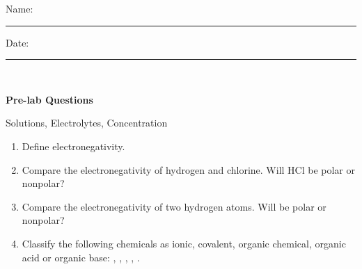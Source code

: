 \documentclass[main.tex]{subfiles}
\begin{document}
\newpage
\setdoublesep{0.35700 em}  %
\setatomsep{1.78500 em}    %
\setbondoffset{0.18265 em} %
\newcommand{\bondwidth}{0.06642 em} %
\setbondstyle{line width = \bondwidth}

 




\begin{multicols}{2}
\begin{tcolorbox}[enhanced jigsaw,breakable,size=title,
colback=mybrown!05,colframe=black,fonttitle=\bfseries,
title=STUDENT INFO,pad at break=1mm, break at=15cm/0pt ]
\vspace{0.2cm}
\noindent Name: \rule{5cm}{0.4pt}Date:\rule{1cm}{0.4pt}\\
 \end{tcolorbox}
\end{multicols}
\hfill
\vspace{0.2cm}
\begin{center}
{\large \bfseries 
Pre-lab Questions 
\par
\Huge
Solutions, Electrolytes, Concentration 
\\[5pt] \par}
\vspace{0.2cm}
\end{center}
\par
\noindent
\uline{  \hfill \normalsize \hfill       }

\begin{enumerate}
\item Define electronegativity.
\vspace{3cm}

\item Compare the electronegativity of hydrogen and chlorine. Will HCl be polar or nonpolar?
\vspace{3cm}

\item Compare the electronegativity of two hydrogen atoms. Will  be polar or nonpolar?
\vspace{3cm}


\item Classify the following chemicals as ionic, covalent, organic chemical, organic acid or organic base: ,  , , , .
\vspace{3cm}

\end{enumerate}
\end{document}
